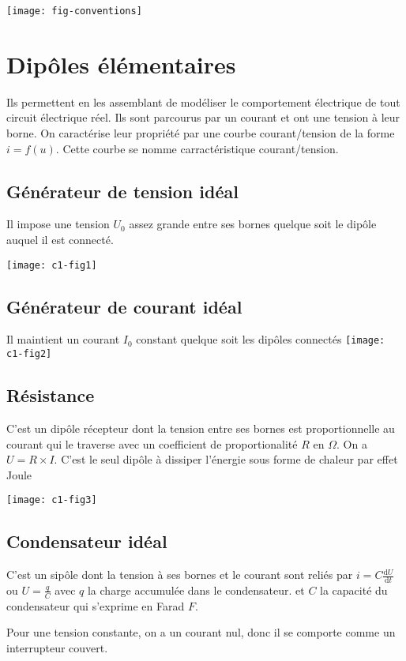 \documentclass[french]{yLectureNote}
\begin{document}
\texttt{[image: fig-conventions]}
\section{Dip\^oles élémentaires}
Ils permettent en les assemblant  de modéliser le comportement électrique de tout circuit électrique réel. Ils sont parcourus par un courant et ont une tension à leur borne. On caractérise leur propriété par une courbe courant/tension de la forme \(i = f(u)\). Cette courbe se nomme carractéristique courant/tension.
\subsection{Générateur de tension idéal}
Il impose une tension $U_0$ assez grande entre ses bornes quelque soit le dip\^ole auquel il est connecté.

\texttt{[image: c1-fig1]}
\subsection{Générateur de courant idéal}
Il maintient un courant $I_0$ constant quelque soit les dip\^oles connectés \texttt{[image: c1-fig2]}
\subsection{Résistance}
C'est un dip\^ole récepteur dont la tension entre ses bornes est proportionnelle au courant qui le traverse avec un coefficient de proportionalité $R$ en $\Omega$. On a $U=R\times I$. C'est le seul dip\^ole à dissiper l'énergie sous forme de chaleur par effet Joule

\texttt{[image: c1-fig3]}
\subsection{Condensateur idéal}
C'est un sip\^ole dont la tension à ses bornes et le courant sont reliés par $i = C \frac{\mathrm{d}U}{\mathrm{d}t}$ ou $U = \frac{q}{C}$ avec $q$ la charge accumulée dans le condensateur. et $C$ la capacité du condensateur qui s'exprime en Farad $F$.

Pour une tension constante, on a un courant nul, donc il se comporte comme un interrupteur couvert.


\end{document}
